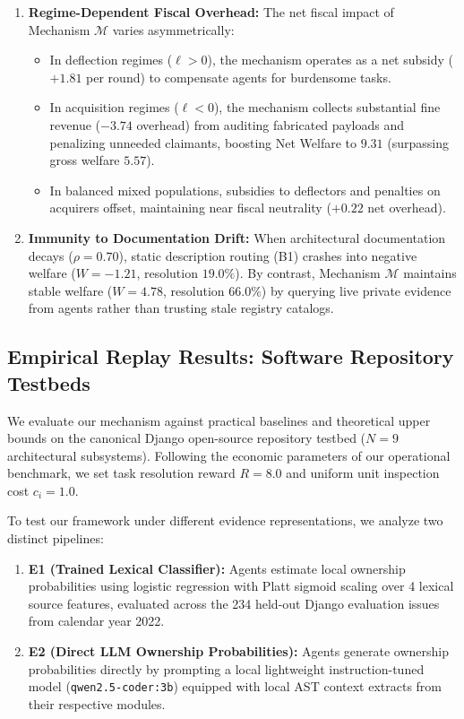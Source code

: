 \documentclass{article}
\theoremstyle{definition}
\begin{document}
\begin{enumerate}
    \item \textbf{Regime-Dependent Fiscal Overhead:} The net fiscal impact of Mechanism $\mathcal{M}$ varies asymmetrically:
    \begin{itemize}
        \item In deflection regimes ($\ell > 0$), the mechanism operates as a net subsidy ($+1.81$ per round) to compensate agents for burdensome tasks.
        \item In acquisition regimes ($\ell < 0$), the mechanism collects substantial fine revenue ($-3.74$ overhead) from auditing fabricated payloads and penalizing unneeded claimants, boosting Net Welfare to $9.31$ (surpassing gross welfare $5.57$).
        \item In balanced mixed populations, subsidies to deflectors and penalties on acquirers offset, maintaining near fiscal neutrality ($+0.22$ net overhead).
    \end{itemize}

    \item \textbf{Immunity to Documentation Drift:} When architectural documentation decays ($\rho = 0.70$), static description routing (B1) crashes into negative welfare ($W = -1.21$, resolution $19.0\%$). By contrast, Mechanism $\mathcal{M}$ maintains stable welfare ($W = 4.78$, resolution $66.0\%$) by querying live private evidence from agents rather than trusting stale registry catalogs.
\end{enumerate}

\subsection{Empirical Replay Results: Software Repository Testbeds}
\label{subsec:empirical_results}

We evaluate our mechanism against practical baselines and theoretical upper bounds on the canonical Django open-source repository testbed ($N=9$ architectural subsystems). Following the economic parameters of our operational benchmark, we set task resolution reward $R = 8.0$ and uniform unit inspection cost $c_i = 1.0$. 

To test our framework under different evidence representations, we analyze two distinct pipelines:
\begin{enumerate}
    \item \textbf{E1 (Trained Lexical Classifier):} Agents estimate local ownership probabilities using logistic regression with Platt sigmoid scaling over 4 lexical source features, evaluated across the 234 held-out Django evaluation issues from calendar year 2022.
    \item \textbf{E2 (Direct LLM Ownership Probabilities):} Agents generate ownership probabilities directly by prompting a local lightweight instruction-tuned model (\texttt{qwen2.5-coder:3b}) equipped with local AST context extracts from their respective modules.
\end{enumerate}
\end{document}
